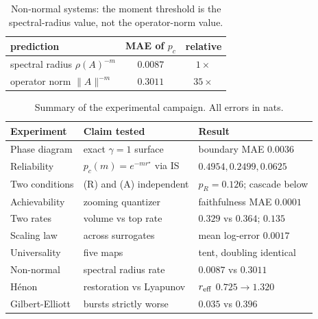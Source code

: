 \documentclass[journal]{IEEEtran}
\theoremstyle{definition}
\theoremstyle{remark}
\begin{document}
\begin{table}[t]
\centering
\caption{Non-normal systems: the moment threshold is the spectral-radius value, not the operator-norm value.}
\label{tab:nonnormal}
\renewcommand{\arraystretch}{1.2}
\footnotesize
\begin{tabular}{@{}lcc@{}}
\toprule
prediction & MAE of $p_c$ & relative \\
\midrule
spectral radius $\rho(A)^{-m}$ & $0.0087$ & $1\times$ \\
operator norm $\|A\|^{-m}$ & $0.3011$ & $35\times$ \\
\bottomrule
\end{tabular}
\end{table}

\begin{table}[t]
\centering
\caption{Summary of the experimental campaign. All errors in nats.}
\label{tab:results2}
\renewcommand{\arraystretch}{1.2}
\small
\begin{tabular}{@{}lll@{}}
\toprule
Experiment & Claim tested & Result \\
\midrule
Phase diagram & exact $\gamma=1$ surface & boundary MAE $0.0036$ \\
Reliability & $p_c(m)=e^{-m r^\star}$ via IS & $0.4954,0.2499,0.0625$ \\
Two conditions & (R) and (A) independent & $p_R=0.126$; cascade below \\
Achievability & zooming quantizer & faithfulness MAE $0.0001$ \\
Two rates & volume vs top rate & $0.329$ vs $0.364$; $0.135$ \\
Scaling law & across surrogates & mean log-error $0.0017$ \\
Universality & five maps & tent, doubling identical \\
Non-normal & spectral radius rate & $0.0087$ vs $0.3011$ \\
H\'enon & restoration vs Lyapunov & $r_{\rm eff}$ $0.725\!\to\!1.320$ \\
Gilbert-Elliott & bursts strictly worse & $0.035$ vs $0.396$ \\
\bottomrule
\end{tabular}
\end{table}

\end{document}
